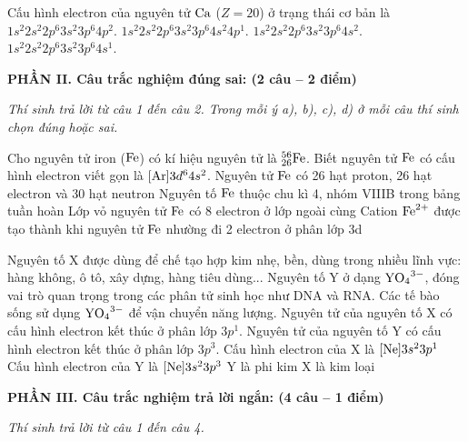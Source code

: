 \documentclass[11pt,a4paper]{article}
\begin{document}
\begin{ex}%
Cấu hình electron của nguyên tử $\ce{Ca}$ ($Z = 20$) ở trạng thái cơ bản là
\choice
{$1s^2 2s^2 2p^6 3s^2 3p^6 4p^2$.}
{$1s^2 2s^2 2p^6 3s^2 3p^6 4s^2 4p^1$.}
{\True $1s^2 2s^2 2p^6 3s^2 3p^6 4s^2$.}
{$1s^2 2s^2 2p^6 3s^2 3p^6 4s^1$.}

\end{ex}

\vspace{6pt}
\noindent
\textbf{\large\color{mainGreen}PHẦN II. Câu trắc nghiệm đúng sai: (2 câu – 2 điểm)}

\textit{Thí sinh trả lời từ câu 1 đến câu 2. Trong mỗi ý a), b), c), d) ở mỗi câu thí sinh chọn đúng hoặc sai.}
\vspace{4pt}

\begin{ex}%
Cho nguyên tử iron ($\ce{Fe}$) có kí hiệu nguyên tử là $^{56}_{26}\ce{Fe}$. Biết nguyên tử $\ce{Fe}$ có cấu hình electron viết gọn là $[\ce{Ar}]3d^6 4s^2$.
\choiceTF
{\True Nguyên tử $\ce{Fe}$ có 26 hạt proton, 26 hạt electron và 30 hạt neutron}
{\True Nguyên tố $\ce{Fe}$ thuộc chu kì 4, nhóm VIIIB trong bảng tuần hoàn}
{Lớp vỏ nguyên tử $\ce{Fe}$ có 8 electron ở lớp ngoài cùng}
{Cation $\ce{Fe^{2+}}$ được tạo thành khi nguyên tử $\ce{Fe}$ nhường đi 2 electron ở phân lớp 3d}

\end{ex}

\begin{ex}%
Nguyên tố X được dùng để chế tạo hợp kim nhẹ, bền, dùng trong nhiều lĩnh vực: hàng không, ô tô, xây dựng, hàng tiêu dùng... Nguyên tố Y ở dạng $\ce{YO4^{3-}}$, đóng vai trò quan trọng trong các phân tử sinh học như DNA và RNA. Các tế bào sống sử dụng $\ce{YO4^{3-}}$ để vận chuyển năng lượng. Nguyên tử của nguyên tố X có cấu hình electron kết thúc ở phân lớp $3p^1$. Nguyên tử của nguyên tố Y có cấu hình electron kết thúc ở phân lớp $3p^3$.
\choiceTF
{\True Cấu hình electron của X là $[\ce{Ne}]3s^2 3p^1$}
{\True Cấu hình electron của Y là $[\ce{Ne}]3s^2 3p^3$}
{\True Y là phi kim}
{\True X là kim loại}

\end{ex}

\vspace{6pt}
\noindent
\textbf{\large\color{mainGreen}PHẦN III. Câu trắc nghiệm trả lời ngắn: (4 câu – 1 điểm)}

\textit{Thí sinh trả lời từ câu 1 đến câu 4.}
\vspace{4pt}
\end{document}
